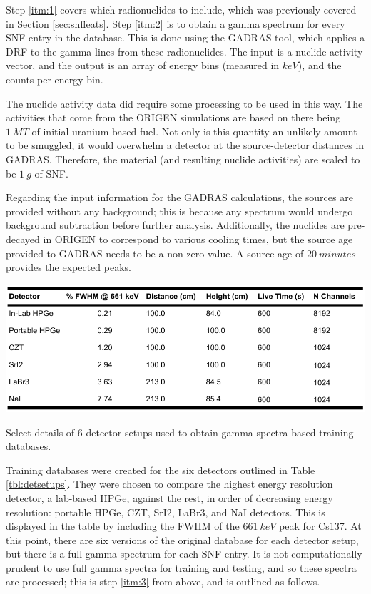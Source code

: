 Step \ref{itm:1} covers which radionuclides to include, which was previously
covered in Section \ref{sec:snffeats}. Step \ref{itm:2} is to obtain a gamma
spectrum for every \gls{SNF} entry in the database. This is done using the
\gls{GADRAS} tool, which applies a \gls{DRF} to the gamma lines from these
radionuclides. The input is a nuclide activity vector, and the output is an
array of energy bins (measured in $keV$), and the counts per energy bin.

The nuclide activity data did require some processing to be used in this way.
The activities that come from the \gls{ORIGEN} simulations are based on there
being $1\:MT$ of initial uranium-based fuel. Not only is this quantity an
unlikely amount to be smuggled, it would overwhelm a detector at the
 source-detector distances in \gls{GADRAS}. Therefore, the material (and
resulting nuclide activities) are scaled to be $1\:g$ of \gls{SNF}.

Regarding the input information for the \gls{GADRAS} calculations, the sources
are provided without any background; this is because any spectrum would undergo
background subtraction before further analysis. Additionally, the nuclides are
pre-decayed in \gls{ORIGEN} to correspond to various cooling times, but the
source age provided to \gls{GADRAS} needs to be a non-zero value. A source age
of $20\:minutes$ provides the expected peaks.

\begin{table}[!h]
  \centering
  \includegraphics[width=\linewidth]{./chapters/method/gadras_detectors.png}
  \caption{Select details of 6 detector setups used to obtain gamma 
           spectra-based training databases.}
  \label{tbl:detsetups}
\end{table}

Training databases were created for the six detectors outlined in Table
\ref{tbl:detsetups}. They were chosen to compare the highest energy resolution
detector, a lab-based \gls{HPGe}, against the rest, in order of decreasing
energy resolution: portable \gls{HPGe}, \gls{CZT}, \gls{SrI2}, \gls{LaBr3}, and
\gls{NaI} detectors. This is displayed in the table by including the \gls{FWHM}
of the $661\:keV$ peak for Cs137. At this point, there are six versions of the
original database for each detector setup, but there is a full gamma spectrum
for each \gls{SNF} entry. It is not computationally prudent to use full gamma
spectra for training and testing, and so these spectra are processed; this is
step \ref{itm:3} from above, and is outlined as follows.

